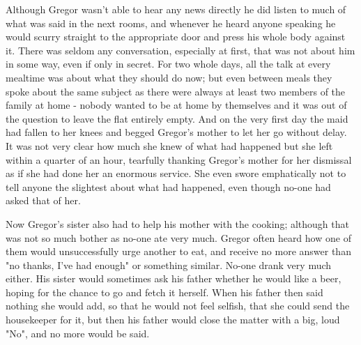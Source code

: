 \documentclass[12pt]{book}
\begin{document}
    Although Gregor wasn't able to hear any news directly he did listen to much of what was said in the next rooms, and whenever he heard anyone speaking he would scurry straight to the appropriate door and press his whole body against it. There was seldom any conversation, especially at first, that was not about him in some way, even if only in secret. For two whole days, all the talk at every mealtime was about what they should do now; but even between meals they spoke about the same subject as there were always at least two members of the family at home - nobody wanted to be at home by themselves and it was out of the question to leave the flat entirely empty. And on the very first day the maid had fallen to her knees and begged Gregor's mother to let her go without delay. It was not very clear how much she knew of what had happened but she left within a quarter of an hour, tearfully thanking Gregor's mother for her dismissal as if she had done her an enormous service. She even swore emphatically not to tell anyone the slightest about what had happened, even though no-one had asked that of her.

    Now Gregor's sister also had to help his mother with the cooking; although that was not so much bother as no-one ate very much. Gregor often heard how one of them would unsuccessfully urge another to eat, and receive no more answer than "no thanks, I've had enough" or something similar. No-one drank very much either. His sister would sometimes ask his father whether he would like a beer, hoping for the chance to go and fetch it herself. When his father then said nothing she would add, so that he would not feel selfish, that she could send the housekeeper for it, but then his father would close the matter with a big, loud "No", and no more would be said.
\end{document}

